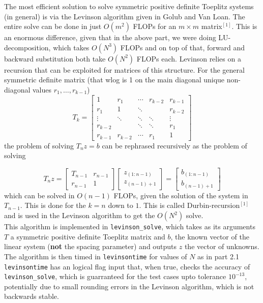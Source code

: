 \documentclass[paper=a4, fontsize=12pt]{scrartcl} %
\numberwithin{equation}{section}       %
\numberwithin{figure}{section}         %
\numberwithin{table}{section}          %
\begin{document}
\noindent The most efficient solution to solve symmetric positive definite Toeplitz systems (in general) is via the Levinson algorithm given in Golub and Van Loan. The entire solve can be done in just $O(m^2)$ FLOPs for an $m\times m$ matrix$^{[1]}$. This is an enormous difference, given that in the above part, we were doing LU-decomposition, which takes $O(N^3)$ FLOPs and on top of that, forward and backward substitution both take $O(N^2)$ FLOPs each. Levinson relies on a recursion that can be exploited for matrices of this structure. For the general symmetric definite matrix (that wlog is 1 on the main diagonal unique non-diagonal values $r_1,\dots,r_{k-1}$)
$$T_k =
\begin{bmatrix} 
1 & r_1 & \cdots & r_{k-2} & r_{k-1} \\ 
r_{1} & 1 & \ddots & & r_{k-2}\\ 
\vdots & \ddots & \ddots & \ddots & \vdots \\ 
r_{k-2} & & \ddots & \ddots & r_{1} \\
r_{k-1} & r_{k-2} & \cdots & r_1 &  1 
\end{bmatrix}
$$
\noindent the problem of solving $T_nz = b$ can be rephrased recursively as the problem of solving 

$$T_nz = 
\begin{bmatrix}
T_{n-1} & r_{n-1} \\
r_{n-1} & 1
\end{bmatrix}
\begin{bmatrix}
z_{(1:n-1)} \\
z_{(n-1)+1}
\end{bmatrix}
= 
\begin{bmatrix}
b_{(1:n-1) }\\
b_{(n-1)+1}
\end{bmatrix}
$$ 
\noindent which can be solved in $O(n-1)$ FLOPs, given the solution of the system in $T_{n-1}$. This is done for the $k=n$ down to $1$. This is called Durbin-recursion$^{[1]}$ and is used in the Levinson algorithm to get the $O(N^2)$ solve. \\

\noindent This algorithm is implemented in \texttt{levinson\_solve}, which takes as its arguments $T$ a symmetric positive definite Toeplitz matrix and $b$, the known vector of the linear system (\textbf{not} the spacing parameter) and outputs $z$ the vector of unknowns. The algorithm is then timed in \texttt{levinsontime} for values of $N$ as in part 2.1 \texttt{levinsontime} has an logical flag input that, when true, checks the accuracy of \texttt{levinson\_solve}, which is guarranteed for the test cases upto tolerance $10^{-13}$, potentially due to small rounding errors in the Levinson algorithm, which is not backwards stable.
\end{document}
